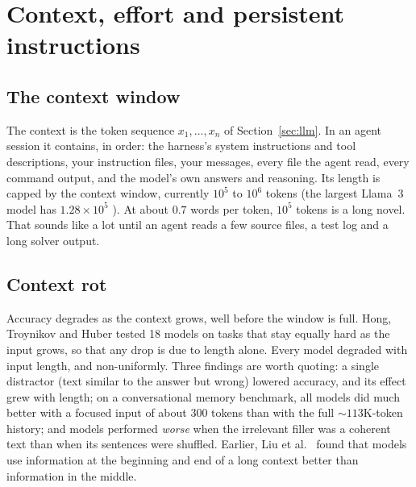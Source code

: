 \section{Context, effort and persistent instructions}\label{sec:context}


\subsection{The context window}

The context is the token sequence $x_1, \ldots, x_n$ of Section~\ref{sec:llm}. In an agent
session it contains, in order: the harness's system instructions and tool descriptions,
your instruction files, your messages, every file the agent read, every command output,
and the model's own answers and reasoning. Its length is capped by the context window,
currently $10^5$ to $10^6$ tokens (the largest Llama~3 model has $1.28 \times 10^5$
). At about $0.7$ words per token, $10^5$ tokens is a long novel. That sounds
like a lot until an agent reads a few source files, a test log and a long solver output.

\subsection{Context rot}

Accuracy degrades as the context grows, well before the window is full. Hong, Troynikov
and Huber  tested 18 models on tasks that stay equally hard as the input
grows, so that any drop is due to length alone. Every model degraded with input length,
and non-uniformly. Three findings are worth quoting: a single distractor (text similar to
the answer but wrong) lowered accuracy, and its effect grew with length; on a
conversational memory benchmark, all models did much better with a focused input of about
300 tokens than with the full $\sim 113$K-token history; and models performed
\emph{worse} when the irrelevant filler was a coherent text than when its sentences were
shuffled. Earlier, Liu et al.\  found that models use information at the
beginning and end of a long context better than information in the middle.

